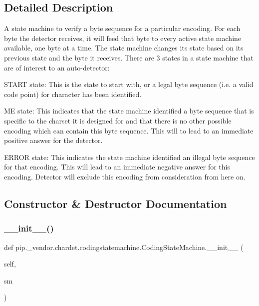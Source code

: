 \subsection{Detailed Description}
\begin{DoxyVerb}A state machine to verify a byte sequence for a particular encoding. For
each byte the detector receives, it will feed that byte to every active
state machine available, one byte at a time. The state machine changes its
state based on its previous state and the byte it receives. There are 3
states in a state machine that are of interest to an auto-detector:

START state: This is the state to start with, or a legal byte sequence
             (i.e. a valid code point) for character has been identified.

ME state:  This indicates that the state machine identified a byte sequence
           that is specific to the charset it is designed for and that
           there is no other possible encoding which can contain this byte
           sequence. This will to lead to an immediate positive answer for
           the detector.

ERROR state: This indicates the state machine identified an illegal byte
             sequence for that encoding. This will lead to an immediate
             negative answer for this encoding. Detector will exclude this
             encoding from consideration from here on.
\end{DoxyVerb}
 

\subsection{Constructor \& Destructor Documentation}
\mbox{\label{classpip_1_1__vendor_1_1chardet_1_1codingstatemachine_1_1CodingStateMachine_ac38ba14c34673a2370107da23bd2906d}} 
\subsubsection{\texorpdfstring{\+\_\+\+\_\+init\+\_\+\+\_\+()}{\_\_init\_\_()}}
{\footnotesize\ttfamily def pip.\+\_\+vendor.\+chardet.\+codingstatemachine.\+Coding\+State\+Machine.\+\_\+\+\_\+init\+\_\+\+\_\+ (\begin{DoxyParamCaption}\item[{}]{self,  }\item[{}]{sm }\end{DoxyParamCaption})}



